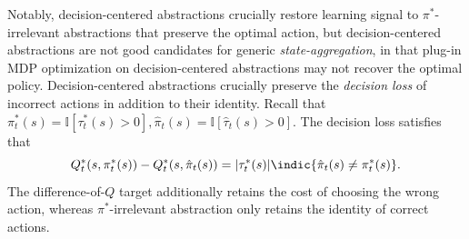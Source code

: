 \documentclass[opre,nonblindrev]{informs4}
\newenvironment{revision}{\begingroup\color{revisionblue}\ignorespaces}{\endgroup}
\newcommand{\blipadv}{\tau}
\newcommand{\A}{\mathcal A}
\begin{document}
\begin{revision}

 


  Notably, decision-centered abstractions crucially restore learning signal to $\pi^*$-irrelevant abstractions that preserve the optimal action, but decision-centered abstractions are not good candidates for generic \textit{state-aggregation}, in that plug-in MDP optimization on decision-centered abstractions may not recover the optimal policy. Decision-centered abstractions crucially preserve the \textit{decision loss} of incorrect actions in addition to their identity. Recall that $\pi_t^*(s)=\mathbb I[\tau_t^*(s)>0], \hat\pi_t(s)=\mathbb I[\hat\tau_t(s)>0]$.
The decision loss satisfies that 
\[
Q_t^*(s,\pi_t^*(s))
-
Q_t^*(s,\hat\pi_t(s))
=
|\tau_t^*(s)|
\indic{\hat\pi_t(s)\neq\pi_t^*(s)}.
\]
The
difference-of-\(Q\) target additionally retains the cost of choosing the
wrong action, whereas \(\pi^*\)-irrelevant abstraction only retains the identity of correct actions. %



\end{revision}
\end{document}
